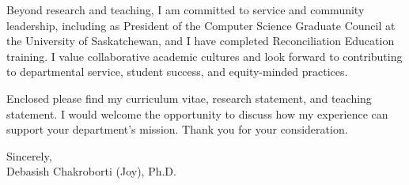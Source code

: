 \documentclass[10pt]{letter}
\begin{document}
Beyond research and teaching, I am committed to service and community leadership, including as President of the Computer Science Graduate Council at the University of Saskatchewan, and I have completed Reconciliation Education training. I value collaborative academic cultures and look forward to contributing to departmental service, student success, and equity-minded practices.

Enclosed please find my curriculum vitae, research statement, and teaching statement. I would welcome the opportunity to discuss how my experience can support your department's mission. Thank you for your consideration.

\vspace{0.7em}
\noindent Sincerely,\\[0.9em]
Debasish Chakroborti (Joy), Ph.D.
\end{document}
